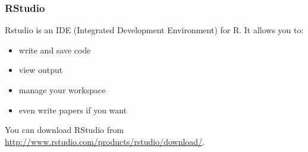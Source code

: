 \documentclass[slidestop,compress,mathserif]{beamer}\usepackage[]{graphicx}\usepackage[]{color}
\begin{document}
\begin{frame}[fragile]

\frametitle{RStudio}

Rstudio is an IDE (Integrated Development Environment) for R.  It allows you to: 

\begin{itemize}
	\item write and save code 
	\item view output 
	\item manage your workspace
	\item even write papers if you want
\end{itemize} 

You can download RStudio from \url{http://www.rstudio.com/products/rstudio/download/}.

\end{frame}
\end{document}
